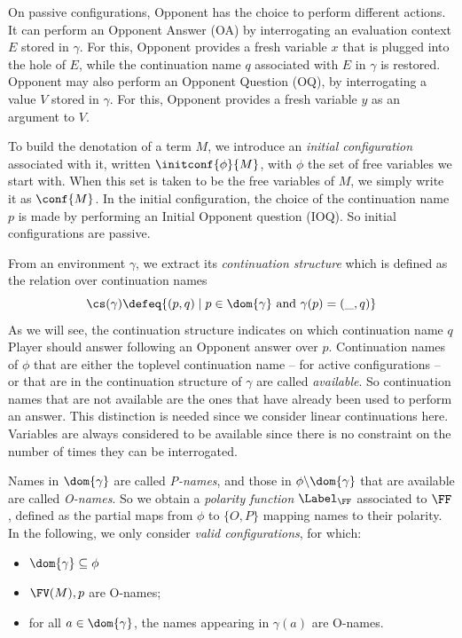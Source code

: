  
On passive configurations, Opponent has the choice to perform different actions.
It can  perform an Opponent Answer (OA) by interrogating an evaluation context 
$E$ stored in $\gamma$. For this, Opponent provides a fresh variable $x$ that is plugged into the hole of $E$,
while the continuation name $q$ associated with $E$ in $\gamma$ is restored.
Opponent may also  perform  an Opponent Question (OQ),
by interrogating a value $V$ stored in $\gamma$. 
For this, Opponent provides a fresh variable $y$ as an argument to $V$.


To build the denotation of a term $M$, we introduce an \emph{initial
configuration} associated with it, 
written $\initconf{\phi}{M}$, with $\phi$ the set of free variables we start with.
When this set is taken to be the free variables of $M$, we simply write it as $\conf{M}$.
In the initial configuration, the choice of the continuation
name $p$ is made by performing an Initial Opponent question
(IOQ). So initial configurations are passive.

From an environment $\gamma$, we extract its \emph{continuation structure}
which is defined
as the relation over continuation names 
\[\cs(\gamma) \defeq \{(p,q) \mid p \in \dom{\gamma} \text{ and } \gamma(p) = (\_,q)\}\]
As we will see, the continuation structure indicates
on which continuation name $q$ Player should answer 
following an Opponent answer over $p$.
Continuation names of $\phi$ that are either
the toplevel continuation name -- for active configurations --
or that are in the continuation structure of $\gamma$ are called \emph{available}.
So continuation names that are not available are the ones that
have already been used to perform an answer.
This distinction is needed since we consider linear continuations here.
Variables are always considered to be available since there is
no constraint on the number of times they can be interrogated.

Names in $\dom{\gamma}$ are called \emph{P-names}, 
and those in $\phi \backslash \dom{\gamma}$ that are available are called \emph{O-names}.
So we obtain a \emph{polarity function} $\Label_{\FF}$ 
associated to $\FF$, 
defined as the partial maps
from $\phi$ to $\{O,P\}$  mapping names to their polarity.
 In the following, we  only consider \emph{valid configurations},
 for which:
 \begin{itemize}
  \item $\dom{\gamma} \subseteq \phi$
  \item $\FV(M),p$ are O-names;
  \item for all $a \in \dom{\gamma}$, the names appearing in $\gamma(a)$ are O-names.
 \end{itemize}